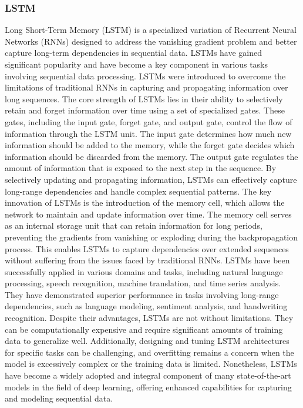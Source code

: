 \subsubsection{LSTM}
Long Short-Term Memory (LSTM) is a specialized variation of Recurrent Neural Networks (RNNs) designed to address the vanishing gradient problem and better capture long-term dependencies in sequential data. LSTMs have gained significant popularity and have become a key component in various tasks involving sequential data processing.
LSTMs were introduced to overcome the limitations of traditional RNNs in capturing and propagating information over long sequences. The core strength of LSTMs lies in their ability to selectively retain and forget information over time using a set of specialized gates. These gates, including the input gate, forget gate, and output gate, control the flow of information through the LSTM unit.
The input gate determines how much new information should be added to the memory, while the forget gate decides which information should be discarded from the memory. The output gate regulates the amount of information that is exposed to the next step in the sequence. By selectively updating and propagating information, LSTMs can effectively capture long-range dependencies and handle complex sequential patterns.
The key innovation of LSTMs is the introduction of the memory cell, which allows the network to maintain and update information over time. The memory cell serves as an internal storage unit that can retain information for long periods, preventing the gradients from vanishing or exploding during the backpropagation process. This enables LSTMs to capture dependencies over extended sequences without suffering from the issues faced by traditional RNNs.
LSTMs have been successfully applied in various domains and tasks, including natural language processing, speech recognition, machine translation, and time series analysis. They have demonstrated superior performance in tasks involving long-range dependencies, such as language modeling, sentiment analysis, and handwriting recognition.
Despite their advantages, LSTMs are not without limitations. They can be computationally expensive and require significant amounts of training data to generalize well. Additionally, designing and tuning LSTM architectures for specific tasks can be challenging, and overfitting remains a concern when the model is excessively complex or the training data is limited.
Nonetheless, LSTMs have become a widely adopted and integral component of many state-of-the-art models in the field of deep learning, offering enhanced capabilities for capturing and modeling sequential data.
